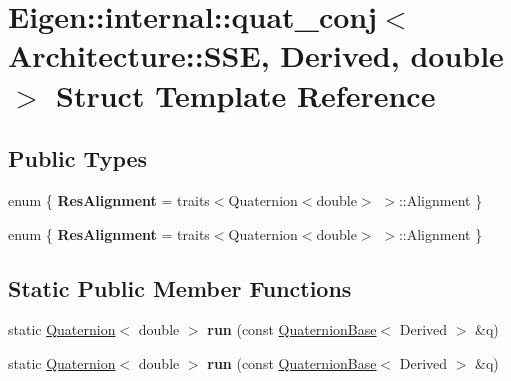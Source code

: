 \hypertarget{struct_eigen_1_1internal_1_1quat__conj_3_01_architecture_1_1_s_s_e_00_01_derived_00_01double_01_4}{}\section{Eigen\+:\+:internal\+:\+:quat\+\_\+conj$<$ Architecture\+:\+:S\+SE, Derived, double $>$ Struct Template Reference}
\label{struct_eigen_1_1internal_1_1quat__conj_3_01_architecture_1_1_s_s_e_00_01_derived_00_01double_01_4}
\subsection*{Public Types}
\begin{DoxyCompactItemize}
\item 
\mbox{\label{struct_eigen_1_1internal_1_1quat__conj_3_01_architecture_1_1_s_s_e_00_01_derived_00_01double_01_4_ad8f6a5cdae845453ccee26793ca0e6da}} 
enum \{ {\bfseries Res\+Alignment} = traits$<$Quaternion$<$double$>$ $>$\+:\+:Alignment
 \}
\item 
\mbox{\label{struct_eigen_1_1internal_1_1quat__conj_3_01_architecture_1_1_s_s_e_00_01_derived_00_01double_01_4_a26d477680e807739914bce0b61e451fc}} 
enum \{ {\bfseries Res\+Alignment} = traits$<$Quaternion$<$double$>$ $>$\+:\+:Alignment
 \}
\end{DoxyCompactItemize}
\subsection*{Static Public Member Functions}
\begin{DoxyCompactItemize}
\item 
\mbox{\label{struct_eigen_1_1internal_1_1quat__conj_3_01_architecture_1_1_s_s_e_00_01_derived_00_01double_01_4_afbb05c8c91c03e8911289353bd9324d3}} 
static \hyperlink{group___geometry___module_class_eigen_1_1_quaternion}{Quaternion}$<$ double $>$ {\bfseries run} (const \hyperlink{group___geometry___module_class_eigen_1_1_quaternion_base}{Quaternion\+Base}$<$ Derived $>$ \&q)
\item 
\mbox{\label{struct_eigen_1_1internal_1_1quat__conj_3_01_architecture_1_1_s_s_e_00_01_derived_00_01double_01_4_afbb05c8c91c03e8911289353bd9324d3}} 
static \hyperlink{group___geometry___module_class_eigen_1_1_quaternion}{Quaternion}$<$ double $>$ {\bfseries run} (const \hyperlink{group___geometry___module_class_eigen_1_1_quaternion_base}{Quaternion\+Base}$<$ Derived $>$ \&q)
\end{DoxyCompactItemize}



